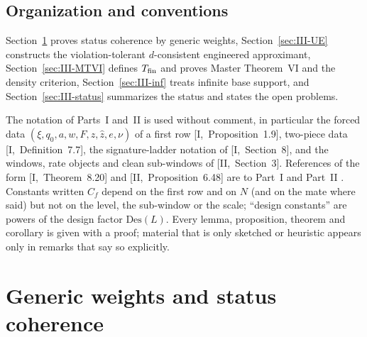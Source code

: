 \documentclass[10pt]{amsart}
\theoremstyle{definition}
\theoremstyle{remark}
\newcommand{\zh}{\hat z}
\begin{document}
\subsection{Organization and conventions}
Section~\ref{sec:III-generic} proves status coherence by generic weights,
Section~\ref{sec:III-UE} constructs the violation-tolerant $d$-consistent
engineered approximant, Section~\ref{sec:III-MTVI} defines $T_{\rm fin}$ and
proves Master Theorem~VI and the density criterion,
Section~\ref{sec:III-inf} treats infinite base support, and
Section~\ref{sec:III-status} summarizes the status and states the open
problems.

The notation of Parts~I and~II is used without comment, in particular the
forced data $(\xi,q_0,a,w,F,z,\zh,e,\nu)$ of a first row
[I,~Proposition~1.9], two-piece data [I,~Definition~7.7], the
signature-ladder notation of [I,~Section~8], and the windows, rate objects
and clean sub-windows of [II,~Section~3].  References of the form
[I,~Theorem~8.20] and [II,~Proposition~6.48] are to Part~I \cite{PartI} and
Part~II \cite{PartII}.  Constants written $C_f$ depend on the first row
and on $N$ (and on the mate where said) but not on the level, the sub-window or the
scale; ``design constants'' are powers of the design factor
$\mathrm{Des}(L)$.  Every lemma, proposition, theorem and corollary is
given with a proof; material that is only sketched or heuristic appears
only in remarks that say so explicitly.
\section{Generic weights and status coherence}\label{sec:III-generic}
\end{document}
